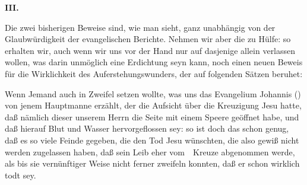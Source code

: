 \vabst \textbf{III.}~\par
Die zwei bisherigen Beweise sind, wie man sieht, ganz unabhängig von der Glaubwürdigkeit der evangelischen Berichte. Nehmen wir aber die  zu Hülfe: so erhalten wir, auch wenn wir uns vor der Hand nur auf dasjenige allein verlassen wollen, was darin unmöglich eine Erdichtung seyn kann, noch einen neuen Beweis für die Wirklichkeit des Auferstehungswunders, der auf folgenden Sätzen beruhet:
\begin{aufza}
\item {}\par
Wenn Jemand auch in Zweifel setzen wollte, was uns das Evangelium Johannis () von jenem Hauptmanne erzählt, der die Aufsicht über die Kreuzigung Jesu hatte, daß nämlich dieser unserem Herrn die Seite mit einem Speere geöffnet habe, und daß hierauf Blut und Wasser hervorgeflossen sey: so ist doch das schon genug, daß es so viele Feinde gegeben, die den Tod Jesu wünschten, die also gewiß nicht werden zugelassen haben, daß sein Leib eher vom~\ Kreuze abgenommen werde, als bis sie vernünftiger Weise nicht ferner zweifeln konnten, daß er schon wirklich todt sey.
\item {}\par

\end{aufza}
